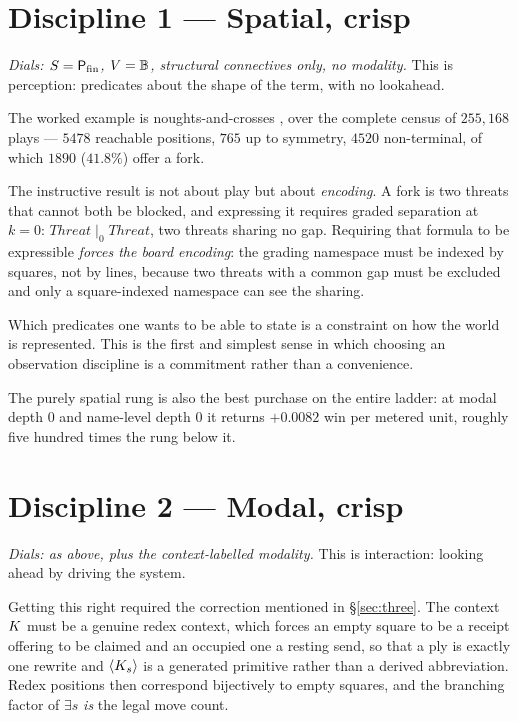 \section{Discipline 1 --- Spatial, crisp}
\label{sec:d1}

\emph{Dials: $S = \mathsf{P}_{\mathrm{fin}}$, $V = \mathbb{B}$, structural connectives only, no
modality.} This is perception: predicates about the shape of the term, with no
lookahead.

The worked example is noughts-and-crosses \cite{GameNote}, over the complete
census of $255{,}168$ plays --- $5478$ reachable positions, $765$ up to symmetry,
$4520$ non-terminal, of which $1890$ ($41.8\%$) offer a fork.

The instructive result is not about play but about \emph{encoding}. A fork is two
threats that cannot both be blocked, and expressing it requires graded separation
at $k=0$: $\mathit{Threat} \mid_{0} \mathit{Threat}$, two threats sharing no gap.
Requiring that formula to be expressible \emph{forces the board encoding}: the
grading namespace must be indexed by squares, not by lines, because two threats
with a common gap must be excluded and only a square-indexed namespace can see the
sharing.

\begin{observation}
\label{obs:encoding}
Which predicates one wants to be able to state is a constraint on how the world is
represented. This is the first and simplest sense in which choosing an observation
discipline is a commitment rather than a convenience.
\end{observation}

The purely spatial rung is also the best purchase on the entire ladder: at modal
depth $0$ and name-level depth $0$ it returns $+0.0082$ win per metered unit,
roughly five hundred times the rung below it.

\section{Discipline 2 --- Modal, crisp}
\label{sec:d2}

\emph{Dials: as above, plus the context-labelled modality.} This is interaction:
looking ahead by driving the system.

Getting this right required the correction mentioned in \S\ref{sec:three}. The
context $K$ must be a genuine redex context, which forces an empty square to be
a receipt offering to be claimed and an occupied one a resting send, so that a ply
is exactly one rewrite and $\langle K_{s}\rangle$ is a generated primitive
rather than a derived abbreviation. Redex positions then correspond bijectively to
empty squares, and the branching factor of $\exists s$ \emph{is} the legal move
count.

